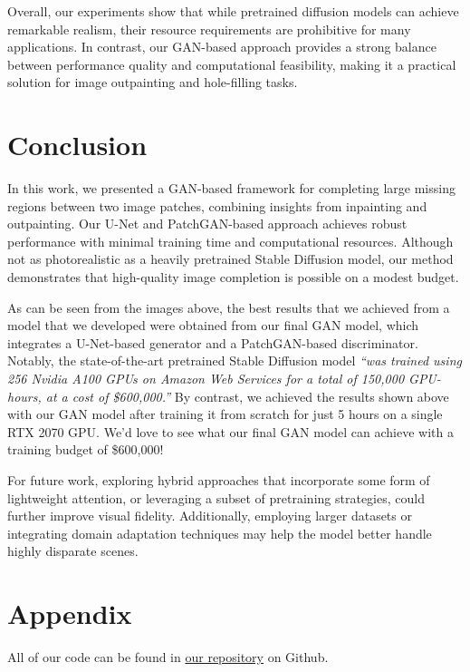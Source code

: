 \documentclass[sigconf]{acmart}
\begin{document}
Overall, our experiments show that while pretrained diffusion models can achieve remarkable realism, their resource requirements are prohibitive for many applications. In contrast, our GAN-based approach provides a strong balance between performance quality and computational feasibility, making it a practical solution for image outpainting and hole-filling tasks.

\section{Conclusion}
In this work, we presented a GAN-based framework for completing large missing regions between two image patches, combining insights from inpainting and outpainting. Our U-Net and PatchGAN-based approach achieves robust performance with minimal training time and computational resources. Although not as photorealistic as a heavily pretrained Stable Diffusion model, our method demonstrates that high-quality image completion is possible on a modest budget.

As can be seen from the images above, the best results that we achieved from a model that we developed were obtained from our final GAN model, which integrates a U-Net-based generator and a PatchGAN-based discriminator. Notably, the state-of-the-art pretrained Stable Diffusion model \textit{“was trained using 256 Nvidia A100 GPUs on Amazon Web Services for a total of 150,000 GPU-hours, at a cost of \$600,000.”} By contrast, we achieved the results shown above with our GAN model after training it from scratch for just 5 hours on a single RTX 2070 GPU. We’d love to see what our final GAN model can achieve with a training budget of \$600,000!

For future work, exploring hybrid approaches that incorporate some form of lightweight attention, or leveraging a subset of pretraining strategies, could further improve visual fidelity. Additionally, employing larger datasets or integrating domain adaptation techniques may help the model better handle highly disparate scenes.

\section{Appendix}

All of our code can be found in \textcolor{red}{\href{https://github.com/yewentao256/CS5787-Final}{our repository}} on Github.
\end{document}
